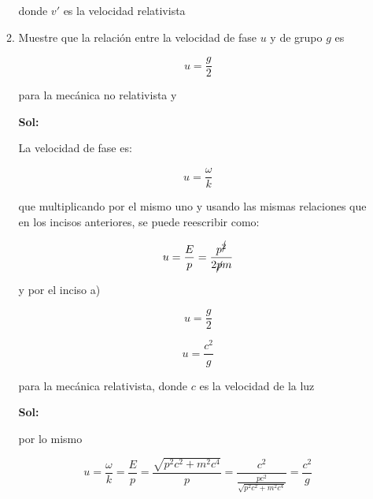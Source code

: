 \documentclass[12pt,a4paper]{article}
\begin{document}
\begin{enumerate}
\begin{enumerate}
        donde $v'$ es la velocidad relativista
        
        \item Muestre que la relación entre la velocidad de fase $u$ y de grupo $g$ es
        
        \begin{equation*}
            u = \frac{g}{2}
        \end{equation*}
        
        para la mecánica no relativista y
        
        \textbf{Sol:}
        
        La velocidad de fase es:
        
        \begin{equation*}
            u = \frac{\omega}{k}
        \end{equation*}
        
        que multiplicando por el mismo uno y usando las mismas relaciones que en los incisos anteriores, se puede reescribir como:
        
        \begin{equation*}
            u = \frac{E}{p} = \frac{p^{\cancel{2}}}{2\cancel{p}m}
        \end{equation*}
        
         y por el inciso a)
         
         \begin{equation*}
             u= \frac{g}{2}
         \end{equation*}
         
         \vspace{1cm}
        
        
        
        \begin{equation*}
            u = \frac{c^2}{g}
        \end{equation*}
        
        para la mecánica relativista, donde $c$ es la velocidad de la luz
        
        \textbf{Sol:}
        
        por lo mismo
        
        \begin{equation*}
            u = \frac{\omega}{k} = \frac{E}{p} = \frac{\sqrt{p^2 c^2 + m^2 c^4}}{p} = \frac{c^2}{\frac{pc^2}{\sqrt{p^2 c^2 + m^2 c^4}}} = \frac{c^2}{g}
        \end{equation*}
        

\end{enumerate}
\end{enumerate}
\end{document}
